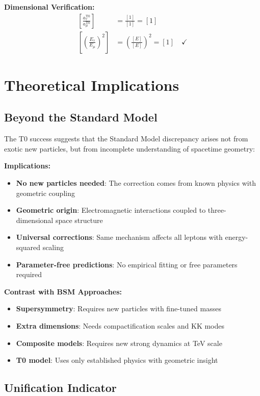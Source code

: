 \documentclass[12pt,a4paper]{report}
\begin{document}
\textbf{Dimensional Verification:}
\begin{align}
	\left[\frac{a_\tau^{\text{T0}}}{a_\mu^{\text{T0}}}\right] &= \frac{[1]}{[1]} = [1] \\
	\left[\left(\frac{E_\tau}{E_\mu}\right)^2\right] &= \left(\frac{[E]}{[E]}\right)^2 = [1] \quad \checkmark
\end{align}

\section{Theoretical Implications}
\label{sec:theoretical_implications}

\subsection{Beyond the Standard Model}
\label{subsec:beyond_standard_model}

The T0 success suggests that the Standard Model discrepancy arises not from exotic new particles, but from incomplete understanding of spacetime geometry:

\textbf{Implications:}
\begin{itemize}
	\item \textbf{No new particles needed}: The correction comes from known physics with geometric coupling
	\item \textbf{Geometric origin}: Electromagnetic interactions coupled to three-dimensional space structure
	\item \textbf{Universal corrections}: Same mechanism affects all leptons with energy-squared scaling
	\item \textbf{Parameter-free predictions}: No empirical fitting or free parameters required
\end{itemize}

\textbf{Contrast with BSM Approaches:}
\begin{itemize}
	\item \textbf{Supersymmetry}: Requires new particles with fine-tuned masses
	\item \textbf{Extra dimensions}: Needs compactification scales and KK modes
	\item \textbf{Composite models}: Requires new strong dynamics at TeV scale
	\item \textbf{T0 model}: Uses only established physics with geometric insight
\end{itemize}

\subsection{Unification Indicator}
\label{subsec:unification_indicator}
\end{document}
